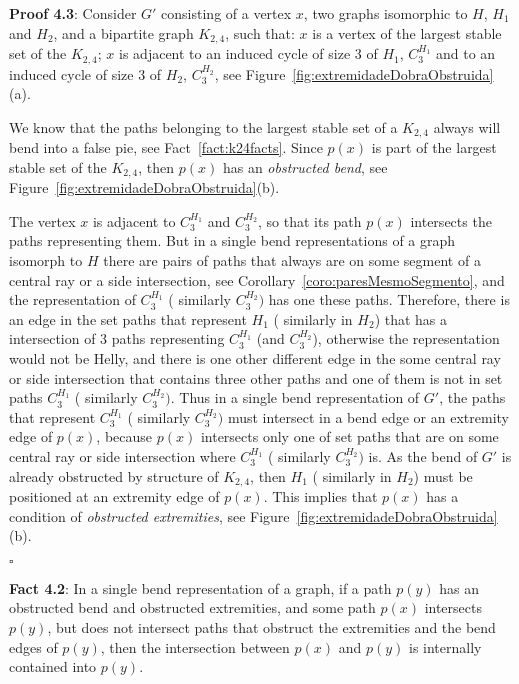 \documentclass[9pt]{entcs}
\begin{document}
\begin{prove*} \textbf{Proof 4.3}: %
Consider $G'$ consisting of a vertex $x$, two graphs isomorphic to $H$, $ H_1 $ and $ H_2 $, and a bipartite graph $K_{2,4}$, such that: $x$ is a vertex of the largest stable set of the $K_{2,4}$; $x$ is adjacent to an induced cycle of size 3 of $H_1$, $C_3^{H_1}$ and to an induced cycle of size 3 of $H_2$, $ C_3^{H_2}$, see Figure~\ref{fig:extremidadeDobraObstruida}(a).

We know that the paths belonging to the largest stable set of a $K_{2,4}$ always will bend into a false pie, see Fact~\ref{fact:k24facts}. Since $p(x)$ is part of the largest stable set of the $K_{2,4}$, then $p(x)$ has an \emph {obstructed bend}, see Figure~\ref{fig:extremidadeDobraObstruida}(b). 

The vertex $x$ is adjacent to $ C_{3}^{H_1}$ and $ C_3^{H_2}$, so that its path $ p(x) $ intersects the paths representing them.  But in a single bend representations of a graph isomorph to $H$ there are pairs of paths that always are on some segment of a central ray or a side intersection, see Corollary~\ref{coro:paresMesmoSegmento}, and the representation of $C_{3}^{H_1}$ ( similarly $C_3^{H_2})$ has one these paths. Therefore, there is an edge in the set paths that represent ${H_1}$ ( similarly in ${H_2}$) that has a intersection of 3 paths representing $ C_{3}^{H_1}$ (and $ C_3^{H_2}$), otherwise the representation would not be Helly, and there is one other different edge in the some central ray or side intersection that contains three other paths and one of them is not in set paths  $C_{3}^{H_1}$ ( similarly $C_3^{H_2})$. Thus in a single bend representation of $G'$, the paths that represent  $C_{3}^{H_1}$ ( similarly $C_3^{H_2})$ must intersect in a bend edge or an extremity edge of $p(x)$, because $p(x)$ intersects only one of set paths that are on some central ray or side intersection where  $C_{3}^{H_1}$ ( similarly $C_3^{H_2})$ is. As the bend of $G'$ is already obstructed by structure of $K_{2,4}$, then ${H_1}$ ( similarly in ${H_2}$) must be positioned at an extremity edge of $p(x)$. This implies that $ p(x) $ has a condition of \emph{obstructed extremities}, see Figure~\ref{fig:extremidadeDobraObstruida}(b).

$\square$ \end{prove*}

\begin{fac*} \textbf{Fact 4.2}:
In a single bend representation of a graph, if a path $p(y)$ has an obstructed bend and obstructed extremities, and some path $p(x)$ intersects $p(y)$, but does not intersect paths that obstruct the extremities and the bend edges of $p(y)$, then the intersection between $p(x)$ and $p(y)$ is internally contained into $p(y)$. 
\end{fac*}
\end{document}
